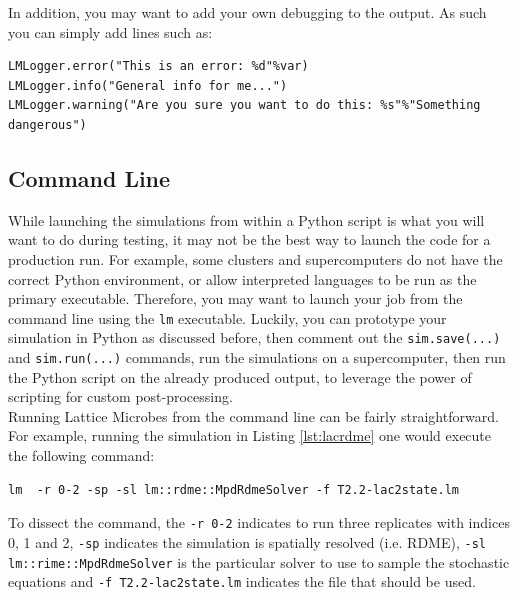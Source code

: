 

In addition, you may want to add your own debugging to the output.  As such you can simply add lines such as:

\begin{lstlisting}[style=customPy, caption={Custom debugging output.}, backgroundcolor=\color{mygray}, label=lst:debug2]
LMLogger.error("This is an error: %d"%var)
LMLogger.info("General info for me...")
LMLogger.warning("Are you sure you want to do this: %s"%"Something dangerous")
\end{lstlisting}


\subsection{Command Line}

While launching the simulations from within a Python script is what you will want to do during testing, it may not be the best way to launch the code for a production run.  For example, some clusters and supercomputers do not have the correct Python environment, or allow interpreted languages to be run as the primary executable.  Therefore, you may want to launch your job from the command line using the \texttt{lm} executable.  Luckily, you can prototype your simulation in Python as discussed before, then comment out the \texttt{sim.save(...)} and \texttt{sim.run(...)} commands, run the simulations on a supercomputer, then run the Python script on the already produced output, to leverage the power of scripting for custom post-processing.  \\

Running Lattice Microbes from the command line can be fairly straightforward.  For example, running the simulation in Listing \ref{lst:lacrdme} one would execute the following command:

\begin{verbatim}
lm  -r 0-2 -sp -sl lm::rdme::MpdRdmeSolver -f T2.2-lac2state.lm
\end{verbatim}

To dissect the command, the \texttt{-r 0-2} indicates to run three replicates with indices 0, 1 and 2, \texttt{-sp} indicates the simulation is spatially resolved (i.e. RDME), \texttt{-sl lm::rime::MpdRdmeSolver} is the particular solver to use to sample the stochastic equations and \texttt{-f T2.2-lac2state.lm} indicates the file that should be used.  \\

